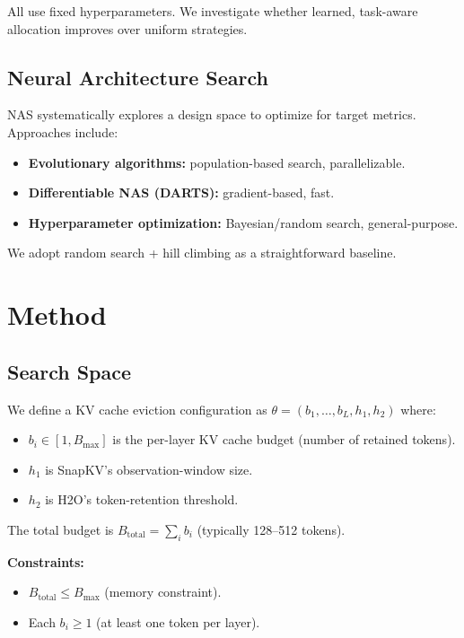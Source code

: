 \documentclass[11pt,a4paper]{article}
\begin{document}
All use fixed hyperparameters. We investigate whether learned, task-aware allocation improves over uniform strategies.

\subsection{Neural Architecture Search}

NAS systematically explores a design space to optimize for target metrics. Approaches include:
\begin{itemize}
    \item \textbf{Evolutionary algorithms:} population-based search, parallelizable.
    \item \textbf{Differentiable NAS (DARTS):} gradient-based, fast.
    \item \textbf{Hyperparameter optimization:} Bayesian/random search, general-purpose.
\end{itemize}

We adopt random search + hill climbing as a straightforward baseline.

\section{Method}

\subsection{Search Space}

We define a KV cache eviction configuration as $\theta = (b_1, \ldots, b_L, h_1, h_2)$ where:
\begin{itemize}
    \item $b_i \in [1, B_{\max}]$ is the per-layer KV cache budget (number of retained tokens).
    \item $h_1$ is SnapKV's observation-window size.
    \item $h_2$ is H2O's token-retention threshold.
\end{itemize}

The total budget is $B_{\text{total}} = \sum_i b_i$ (typically 128–512 tokens).

\textbf{Constraints:}
\begin{itemize}
    \item $B_{\text{total}} \leq B_{\max}$ (memory constraint).
    \item Each $b_i \geq 1$ (at least one token per layer).
\end{itemize}
\end{document}
